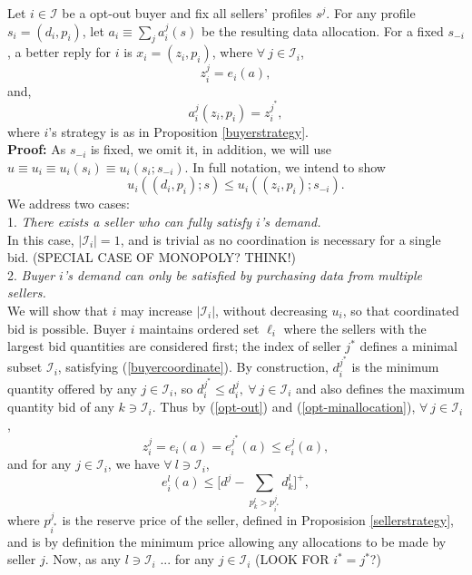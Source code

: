 \documentclass[12pt]{article}
\theoremstyle{definition}
\newcommand{\mcI}{\mathcal{I}}
\begin{document}
\begin{multicols}{2}
{
\label{coordinationlemma} 
Let $i\in\mcI$ be a opt-out buyer and fix all sellers' profiles $s^j$.
For any profile $s_i = (d_i, p_i)$, let $a_i \equiv \sum_j a_i^j(s)$ be the resulting data
allocation. For a fixed $s_{-i}$, a better reply for $i$ is $x_i =
(z_i,p_i)$, where $\forall \ j \in \mcI_i$,
$$
    z_i^j = e_i(a),
$$
and,
\begin{equation}\label{coordination}
    a_i^j(z_i,p_i) = z_i^{j^*},
\end{equation}
where $i$'s strategy is as in Proposition \ref{buyerstrategy}.
}\\
\textbf{Proof:}
As $s_{-i}$ is fixed, we omit it, in addition, we will use $u\equiv u_i \equiv u_i(s_i) \equiv
u_i(s_i;s_{-i})$. In full notation, we intend to show
$$
    u_i((d_i,p_i);s) \le u_i((z_i,p_i);s_{-i}).
$$
We address two cases:\\
1. \emph{There exists a seller who can fully satisfy $i$'s demand.} \\
In this case, $\vert\mcI_i\vert = 1$, and is trivial as no
coordination is necessary for a single bid. (SPECIAL CASE OF MONOPOLY? THINK!)\\
2. \emph{Buyer $i$'s demand can only be satisfied by purchasing data from multiple sellers.} \\
We will show that $i$ may increase $\vert\mcI_i\vert$, without decreasing $u_i$, so that
coordinated bid is possible. 
Buyer $i$ maintains ordered set $\ell_i$ where the sellers with the
largest bid quantities are considered first; the index of seller $j^*$ defines
a minimal subset $\mcI_i$, satisfying (\ref{buyercoordinate}). By construction, 
$d_i^{j^*}$ is the minimum quantity offered by any $j\in \mcI_i$,
so $d_i^{j^*} \le d_i^j, \ \forall \ j \in \mcI_i$ and also defines the
maximum quantity bid of any $k \ni \mcI_i$.
Thus by (\ref{opt-out}) and (\ref{opt-minallocation}), $\forall \ j\in \mcI_i$,
$$
    z_i^j = e_i(a) = e_i^{j^*}(a)  \le e_i^{j}(a),
$$
and for any $j\in\mcI_i$, we have $\forall \ l \ni \mcI_i$,
\begin{equation}\label{minimaleq}
e_i^{l}(a) 
     \le \bigg\lbrack d^{j} - \sum_{p_k^{l}> p_{i^*}^{j}} d_k^{l}\bigg\rbrack^+,
\end{equation}
where $p_{i^*}^j$ is the reserve price of the seller, defined in Proposision
\ref{sellerstrategy}, and is by definition the minimum price allowing any
allocations to be made by seller $j$. Now, as any $l \ni \mcI_i$ ... for any
$j\in\mcI_i$
(LOOK FOR $i^* = j^*$?)


\end{multicols}
\end{document}
